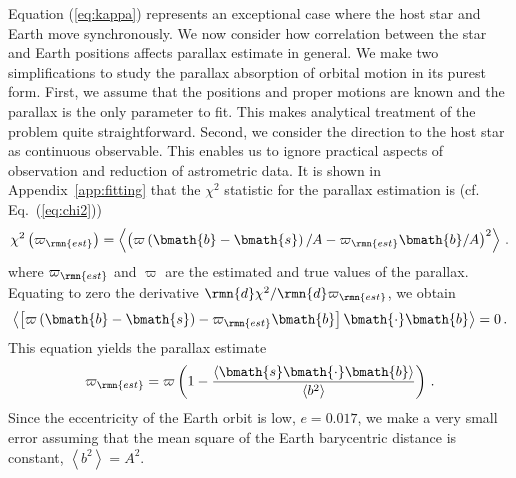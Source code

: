 \documentclass[fleqn,usenatbib,useAMS,usedcolumn]{mnras}
\begin{document}
Equation (\ref{eq:kappa}) represents an exceptional case where the host star and Earth move synchronously. We now consider how correlation between the star and Earth positions affects parallax estimate in general. We make two simplifications to study the parallax absorption of orbital motion in its purest form. First, we assume that the positions and proper motions are known and the parallax is the only parameter to fit. This makes analytical treatment of the problem quite straightforward. Second, we consider the direction to the host star as continuous observable. This enables us to ignore practical aspects of observation and reduction of astrometric data. It is shown in Appendix~\ref{app:fitting} that the $\chi^2$ statistic for the parallax estimation is (cf. Eq.~(\ref{eq:chi2}))
\begin{equation}\label{eq:chi2-replica}
  \chi^2\left(\varpi_\rmn{est}\right)=
  \left\langle
   \left(\varpi\left(\bmath{b}-\bmath{s}\right)/A-\varpi_\rmn{est}\bmath{b}/A\right)^2
  \right\rangle\,.
\end{equation}
where $\varpi_\rmn{est}$ and $\varpi$ are the estimated and true values of the parallax.
Equating to zero the derivative $\rmn{d}\chi^2/\rmn{d}\varpi_\rmn{est}$, we obtain
\begin{equation}\label{eq:profile}
 \left\langle\left[\varpi\left(\bmath{b}-\bmath{s}\right)-\varpi_\rmn{est}\bmath{b}\right]\bmath{\cdot}
 \bmath{b}\right\rangle=0\,.
\end{equation}
This equation yields the parallax estimate
\begin{equation}\label{eq:par-est-def}
 \varpi_\rmn{est}
 =
 \varpi
 \left(1-
 \frac{\left\langle\bmath{s}\bmath{\cdot}\bmath{b}\right\rangle}
 {\left\langle b^2\right\rangle}
 \right)\,.
\end{equation}
Since the eccentricity of the Earth orbit is low, $e=0.017$, we make a very small error assuming that the mean square of the Earth barycentric distance is constant, $\left\langle b^2\right\rangle=A^2$.
\end{document}
